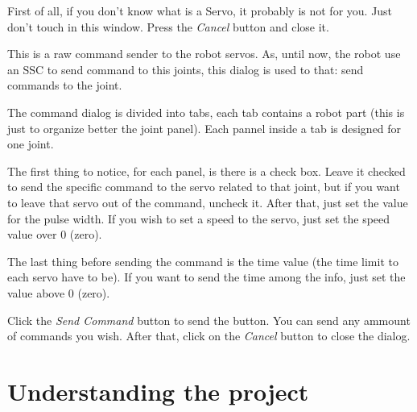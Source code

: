 \documentclass[oneside,a4paper,titlepage]{article}
\begin{document}
First of all, if you don't know what is a Servo, it probably is not for you. Just don't touch in this window. Press the \emph{Cancel} button and close it.

This is a raw command sender to the robot servos. As, until now, the robot use an SSC to send command to this joints, this dialog is used to that: send commands to the joint.

The command dialog is divided into tabs, each tab contains a robot part (this is just to organize better the joint panel). Each pannel inside a tab is designed for one joint.

The first thing to notice, for each panel, is there is a check box. Leave it checked to send the specific command to the servo related to that joint, but if you want to leave that servo out of the command, uncheck it. After that, just set the value for the pulse width. If you wish to set a speed to the servo, just set the speed value over $0$ (zero).

The last thing before sending the command is the time value (the time limit to each servo have to be). If you want to send the time among the info, just set the value above $0$ (zero).

Click the \emph{Send Command} button to send the button. You can send any ammount of commands you wish. After that, click on the \emph{Cancel} button to close the dialog.

\section{Understanding the project}
\end{document}
